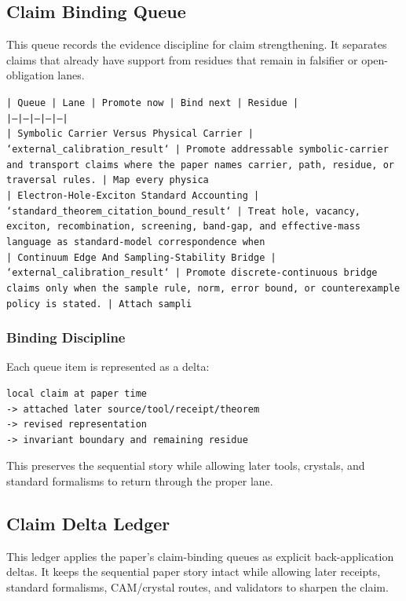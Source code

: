 \documentclass[11pt]{article}
\begin{document}
\subsection*{Claim Binding Queue}

This queue records the evidence discipline for claim strengthening. It separates claims that already have support from residues that remain in falsifier or open-obligation lanes.

\noindent\texttt{| Queue | Lane | Promote now | Bind next | Residue |}\\
\noindent\texttt{|---|---|---|---|---|}\\
\noindent\texttt{| Symbolic Carrier Versus Physical Carrier | `external\_calibration\_result` | Promote addressable symbolic-carrier and transport claims where the paper names carrier, path, residue, or traversal rules. | Map every physica}\\
\noindent\texttt{| Electron-Hole-Exciton Standard Accounting | `standard\_theorem\_citation\_bound\_result` | Treat hole, vacancy, exciton, recombination, screening, band-gap, and effective-mass language as standard-model correspondence when}\\
\noindent\texttt{| Continuum Edge And Sampling-Stability Bridge | `external\_calibration\_result` | Promote discrete-continuous bridge claims only when the sample rule, norm, error bound, or counterexample policy is stated. | Attach sampli}\\

\subsubsection*{Binding Discipline}

Each queue item is represented as a delta:

\begin{verbatim}
local claim at paper time
-> attached later source/tool/receipt/theorem
-> revised representation
-> invariant boundary and remaining residue
\end{verbatim}

This preserves the sequential story while allowing later tools, crystals, and
standard formalisms to return through the proper lane.

\subsection*{Claim Delta Ledger}

This ledger applies the paper's claim-binding queues as explicit back-application
deltas. It keeps the sequential paper story intact while allowing later
receipts, standard formalisms, CAM/crystal routes, and validators to sharpen the
claim.
\end{document}
